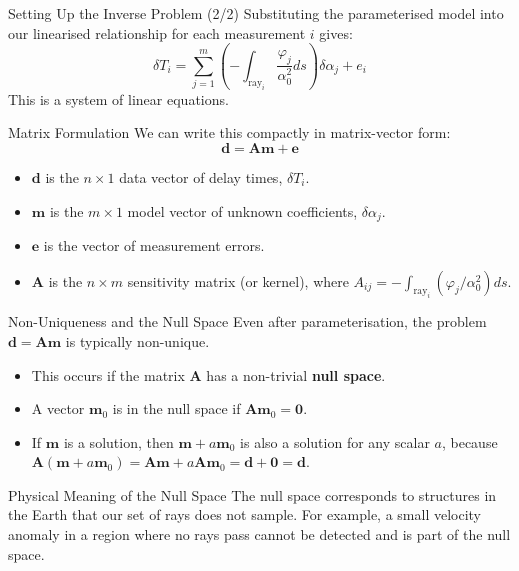 \documentclass{beamer}
\begin{document}
\begin{frame}{Setting Up the Inverse Problem (2/2)}
    Substituting the parameterised model into our linearised relationship for each measurement $i$ gives:
    $$ \delta T_{i}=\sum_{j=1}^{m}\left(-\int_{\text{ray}_{i}}\frac{\varphi_{j}}{\alpha_{0}^{2}}ds\right)\delta\alpha_{j}+e_{i} $$
    \pause
    This is a system of linear equations.
    \begin{alertblock}{Matrix Formulation}
        We can write this compactly in matrix-vector form:
        $$ \mathbf{d} = \mathbf{A}\mathbf{m} + \mathbf{e} $$
        \begin{itemize}
            \item $ \mathbf{d} $ is the $n \times 1$ data vector of delay times, $ \delta T_i $.
            \item $ \mathbf{m} $ is the $m \times 1$ model vector of unknown coefficients, $ \delta\alpha_j $.
            \item $ \mathbf{e} $ is the vector of measurement errors.
            \item $ \mathbf{A} $ is the $n \times m$ sensitivity matrix (or kernel), where $ A_{ij} = -\int_{\text{ray}_{i}}(\varphi_{j}/\alpha_{0}^{2})ds $.
        \end{itemize}
    \end{alertblock}
\end{frame}


\begin{frame}{Non-Uniqueness and the Null Space}
    Even after parameterisation, the problem $ \mathbf{d} = \mathbf{A}\mathbf{m} $ is typically non-unique.
    \begin{itemize}
        \item This occurs if the matrix $ \mathbf{A} $ has a non-trivial \textbf{null space}.
        \pause
        \item A vector $ \mathbf{m}_0 $ is in the null space if $ \mathbf{A}\mathbf{m}_0 = \mathbf{0} $.
        \pause
        \item If $ \mathbf{m} $ is a solution, then $ \mathbf{m} + a\mathbf{m}_0 $ is also a solution for any scalar $a$, because $ \mathbf{A}(\mathbf{m} + a\mathbf{m}_0) = \mathbf{A}\mathbf{m} + a\mathbf{A}\mathbf{m}_0 = \mathbf{d} + \mathbf{0} = \mathbf{d} $.
    \end{itemize}
    \pause
    \begin{exampleblock}{Physical Meaning of the Null Space}
        The null space corresponds to structures in the Earth that our set of rays does not sample. For example, a small velocity anomaly in a region where no rays pass cannot be detected and is part of the null space.
    \end{exampleblock}
\end{frame}
\end{document}
